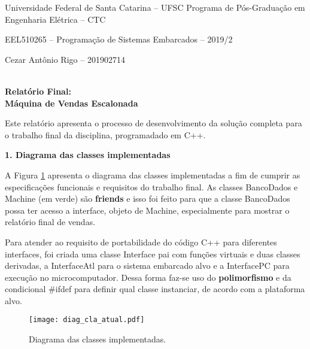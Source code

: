 \documentclass[12pt,a4paper]{report}
\begin{document}
	\begin{center}
		
		{\LARGE  Universidade Federal de Santa Catarina – UFSC}
	    \large Programa de Pós-Graduação em Engenharia Elétrica – CTC
	
		\large EEL510265 – Programação de Sistemas Embarcados – 2019/2
		\end{center}
		\begin{center}
		\large {Cezar Antônio Rigo – 201902714}
			\end{center}

    	\begin{center}
		{\Large \textbf{\\ Relatório Final: }}
		\vspace{5pt}
		{\Large \textbf{\\ Máquina de Vendas Escalonada}}
    	\end{center}
	
\vspace{20pt}

Este relatório apresenta o processo de desenvolvimento da solução completa para o trabalho final da disciplina, programadado em C++.  

\large
\vspace{20pt}
 \textbf {1. Diagrama das classes implementadas}
\vspace{10pt}
\normalsize

A Figura \ref{fig:diag_cla_atual} apresenta o diagrama das classes implementadas a fim de cumprir as especificações funcionais e requisitos do trabalho final. As classes BancoDados e Machine (em verde) são \textbf{friends} e isso foi feito para que a classe BancoDados possa ter acesso a interface, objeto de Machine, especialmente para mostrar o relatório final de vendas. 


Para atender ao requisito de portabilidade do código C++ para diferentes interfaces, foi criada uma classe Interface pai com funções virtuais e duas classes derivadas, a InterfaceAtl para o sistema embarcado alvo e a InterfacePC para execução no microcomputador. Dessa forma faz-se uso do \textbf{polimorfismo} e da condicional \#ifdef para definir qual classe instanciar, de acordo com a plataforma alvo.



\begin{figure}[H]
    \begin{center}
        \texttt{[image: diag\_cla\_atual.pdf]}
        \caption{\small{Diagrama das classes implementadas.}}
        \label{fig:diag_cla_atual}
    \end{center}
\end{figure}
\end{document}
